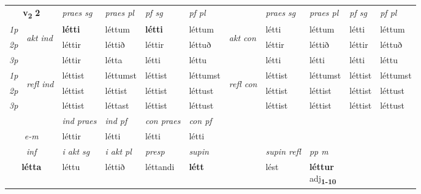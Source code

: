 \noindent
\begin{tabular}{lllllllllll} \toprule
\multicolumn{2}{c}{\textbf{v{\textsubscript{2}}} \Large{\textbf{2}}}  &  \textit{praes sg}  & \textit{praes pl}  &\textit{ pf sg} & \textit{pf pl} &  &  \textit{praes sg}  & \textit{praes pl}  & \textit{pf sg} & \textit{pf pl } \\*
	\cmidrule{3-6} \cmidrule{8-11}
 {\textit{1p}} & \multirow{3}{*}{\begin{turn}{90}\textit{akt ind}\end{turn}} & \textbf{létti} & léttum & \textbf{létti} & léttum & \multirow{3}{*}{\begin{turn}{90}\textit{akt con}\end{turn}} &létti & léttum & létti & léttum\\*
 {\textit{2p}} &  &  léttir  & léttið & léttir & léttuð & & léttir & léttið & léttir & léttuð \\*
{\textit{3p}} &  & léttir & létta & létti & léttu & & létti & létti& létti & léttu \\*
\cmidrule{3-6} \cmidrule{8-11}
 {\textit{1p}} & \multirow{3}{*}{\begin{turn}{90}\textit{refl ind}\end{turn}}  & léttist & léttumst & léttist & léttumst & \multirow{3}{*}{\begin{turn}{90}\textit{refl con}\end{turn}}  &léttist & léttumst & léttist & léttumst \\*
 {\textit{2p}} &  & léttist & léttist & léttist & léttust & &léttist & léttist & léttist & léttust \\*
 {\textit{3p}}  & & léttist & léttast & léttist & léttust & & léttist & léttist& léttist & léttust \\*
\cmidrule{3-6} \cmidrule{8-11}

   & &  \textit{ind praes} & \textit{ind pf} & \textit{con praes} & \textit{con pf} \\*
\multicolumn{2}{c}{ \textit{e-m} } & léttir & létti & létti & létti \\*

\cmidrule{3-9}
   \multicolumn{2}{c}{\textit{inf}}  & \textit{i akt sg} & \textit{i akt pl}   & \textit{presp} & \textit{supin} && \textit{supin refl} & \textit{pp m} \\*
  \multicolumn{2}{c}{\textbf{létta}} & léttu  & léttið   & léttandi &  \textbf{létt} && lést & \specialcell{\textbf{léttur} \\ adj\textbf{\textsubscript{1-10}}} \\*
\end{tabular}

